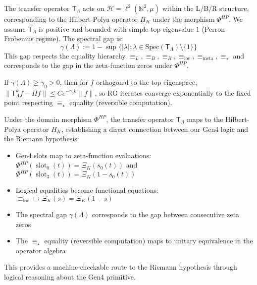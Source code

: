 \begin{definition}
\label{def:transfer-operator-lbr}
The transfer operator $\mathsf{T}_\Lambda$ acts on $\mathcal{H}=\ell^2(\mathbb{N}^2,\mu)$ within the L/B/R structure, corresponding to the Hilbert-Polya operator $H_K$ under the morphism $\Phi^{HP}$. We assume $\mathsf{T}_\Lambda$ is positive and bounded with simple top eigenvalue $1$ (Perron–Frobenius regime). The spectral gap is:
\[
\gamma(\Lambda):=1-\sup\{|\lambda|:\lambda\in\mathrm{Spec}(\mathsf{T}_\Lambda)\setminus\{1\}\}
\]
This gap respects the equality hierarchy $\equiv_L, \equiv_B, \equiv_R, \equiv_{\text{loc}}, \equiv_{\text{meta}}, \equiv_\star$ and corresponds to the gap in the zeta-function zeros under $\Phi^{HP}$.
\end{definition}

\begin{theorem}
\label{thm:mixing-convergence-lbr}
If $\gamma(\Lambda)\ge\gamma_0>0$, then for $f$ orthogonal to the top eigenspace, $\|\mathsf{T}_\Lambda^k f - \Pi f\|\le C e^{-\gamma_0 k}\|f\|$,
so RG iterates converge exponentially to the fixed point respecting $\equiv_\star$ equality (reversible computation).
\end{theorem}

\begin{theorem}
\label{thm:hilbert-polya-connection}
Under the domain morphism $\Phi^{HP}$, the transfer operator $\mathsf{T}_\Lambda$ maps to the Hilbert-Polya operator $H_K$, establishing a direct connection between our Gen4 logic and the Riemann hypothesis:
\begin{itemize}
\item Gen4 slots map to zeta-function evaluations: $\Phi^{HP}(\operatorname{slot}_0(t)) = \Xi_K(s_0(t))$ and $\Phi^{HP}(\operatorname{slot}_3(t)) = \Xi_K(1-s_0(t))$
\item Logical equalities become functional equations: $\equiv_{\text{loc}} \mapsto \Xi_K(s) = \Xi_K(1-s)$
\item The spectral gap $\gamma(\Lambda)$ corresponds to the gap between consecutive zeta zeros
\item The $\equiv_\star$ equality (reversible computation) maps to unitary equivalence in the operator algebra
\end{itemize}
This provides a machine-checkable route to the Riemann hypothesis through logical reasoning about the Gen4 primitive.
\end{theorem}

